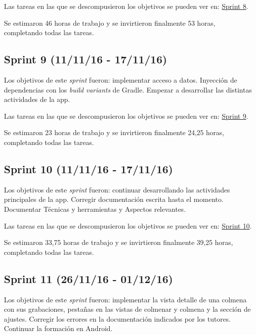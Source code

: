 Las tareas en las que se descompusieron los objetivos se pueden ver en:
\href{https://github.com/davidmigloz/go-bees/milestone/9?closed=1}{Sprint
8}.

Se estimaron 46 horas de trabajo y se invirtieron finalmente 53 horas,
completando todas las tareas.


\subsection{Sprint 9 (11/11/16 -
17/11/16)}\label{sprint-9-111116---171116}

Los objetivos de este \emph{sprint} fueron: implementar acceso a datos.
Inyección de dependencias con los \emph{build variants} de Gradle.
Empezar a desarrollar las distintas actividades de la app.

Las tareas en las que se descompusieron los objetivos se pueden ver en:
\href{https://github.com/davidmigloz/go-bees/milestone/10?closed=1}{Sprint
9}.

Se estimaron 23 horas de trabajo y se invirtieron finalmente 24,25
horas, completando todas las tareas.


\subsection{Sprint 10 (11/11/16 -
17/11/16)}\label{sprint-10-111116---171116}

Los objetivos de este \emph{sprint} fueron: continuar desarrollando las
actividades principales de la app. Corregir documentación escrita hasta
el momento. Documentar Técnicas y herramientas y Aspectos relevantes.

Las tareas en las que se descompusieron los objetivos se pueden ver en:
\href{https://github.com/davidmigloz/go-bees/milestone/11?closed=1}{Sprint
10}.

Se estimaron 33,75 horas de trabajo y se invirtieron finalmente 39,25
horas, completando todas las tareas.


\subsection{Sprint 11 (26/11/16 -
01/12/16)}\label{sprint-11-261116---011216}

Los objetivos de este \emph{sprint} fueron: implementar la vista detalle
de una colmena con sus grabaciones, pestañas en las vistas de colmenar y
colmena y la sección de ajustes. Corregir los errores en la
documentación indicados por los tutores. Continuar la formación en
Android.

